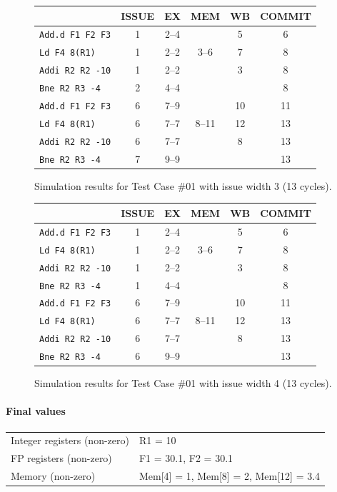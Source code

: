 \documentclass[11pt]{article}
\renewcommand{\_}{\origunderscore\allowbreak}
\begin{document}
\begin{figure}[H]
\centering
\small
\begin{tabular}{lccccc}
\hline
 & ISSUE & EX & MEM & WB & COMMIT \\
\hline
\texttt{Add.d F1 F2 F3} & 1 & 2--4 &  & 5 & 6 \\
\texttt{Ld F4 8(R1)} & 1 & 2--2 & 3--6 & 7 & 8 \\
\texttt{Addi R2 R2 -10} & 1 & 2--2 &  & 3 & 8 \\
\texttt{Bne R2 R3 -4} & 2 & 4--4 &  &  & 8 \\
\texttt{Add.d F1 F2 F3} & 6 & 7--9 &  & 10 & 11 \\
\texttt{Ld F4 8(R1)} & 6 & 7--7 & 8--11 & 12 & 13 \\
\texttt{Addi R2 R2 -10} & 6 & 7--7 &  & 8 & 13 \\
\texttt{Bne R2 R3 -4} & 7 & 9--9 &  &  & 13 \\
\hline
\end{tabular}
\caption{Simulation results for Test Case \#01 with issue width 3 (13 cycles).}
\end{figure}

\begin{figure}[H]
\centering
\small
\begin{tabular}{lccccc}
\hline
 & ISSUE & EX & MEM & WB & COMMIT \\
\hline
\texttt{Add.d F1 F2 F3} & 1 & 2--4 &  & 5 & 6 \\
\texttt{Ld F4 8(R1)} & 1 & 2--2 & 3--6 & 7 & 8 \\
\texttt{Addi R2 R2 -10} & 1 & 2--2 &  & 3 & 8 \\
\texttt{Bne R2 R3 -4} & 1 & 4--4 &  &  & 8 \\
\texttt{Add.d F1 F2 F3} & 6 & 7--9 &  & 10 & 11 \\
\texttt{Ld F4 8(R1)} & 6 & 7--7 & 8--11 & 12 & 13 \\
\texttt{Addi R2 R2 -10} & 6 & 7--7 &  & 8 & 13 \\
\texttt{Bne R2 R3 -4} & 6 & 9--9 &  &  & 13 \\
\hline
\end{tabular}
\caption{Simulation results for Test Case \#01 with issue width 4 (13 cycles).}
\end{figure}

\paragraph{Final values}
\begin{tabularx}{\textwidth}{lX}
\hline
Integer registers (non-zero) & R1 = 10 \\
FP registers (non-zero) & F1 = 30.1, F2 = 30.1 \\
Memory (non-zero) & Mem[4] = 1, Mem[8] = 2, Mem[12] = 3.4 \\
\hline
\end{tabularx}
\end{document}
